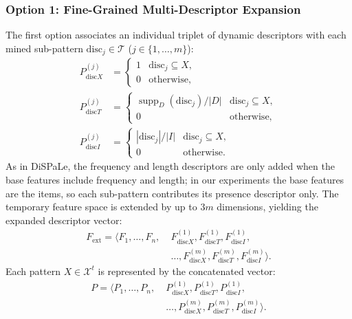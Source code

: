 \documentclass[sigconf]{acmart}
\newcommand{\supp}{\operatorname{supp}}
\newcommand{\disc}{\mathrm{disc}}
\begin{document}
\subsubsection{Option 1: Fine-Grained Multi-Descriptor Expansion}
The first option associates an individual triplet of dynamic descriptors with each mined sub-pattern $\disc_j\in\mathcal T$ ($j\in\{1,\ldots,m\}$):
\begin{align}
 P_{\disc X}^{(j)} & = \begin{cases}1 & \disc_j\subseteq X,\\0 & \text{otherwise},\end{cases} \label{eq:descriptor-x} \\
 P_{\disc T}^{(j)} & = \begin{cases}\supp_D(\disc_j)/|D| & \disc_j\subseteq X,\\0 & \text{otherwise},\end{cases} \label{eq:descriptor-t} \\
 P_{\disc I}^{(j)} & = \begin{cases}|\disc_j|/|I| & \disc_j\subseteq X,\\0 & \text{otherwise}.\end{cases} \label{eq:descriptor-i}
\end{align}
As in DiSPaLe, the frequency and length descriptors are only added when the base features include frequency and length; in our experiments the base features are the items, so each sub-pattern contributes its presence descriptor only. The temporary feature space is extended by up to $3m$ dimensions, yielding the expanded descriptor vector:
\begin{equation}\label{eq:features-fine}
\begin{split}
 F_{\mathrm{ext}}=\langle F_1,\ldots,F_n,\; &F_{\disc X}^{(1)}, F_{\disc T}^{(1)}, F_{\disc I}^{(1)},\\ &\ldots,F_{\disc X}^{(m)}, F_{\disc T}^{(m)}, F_{\disc I}^{(m)}\rangle.
\end{split}
\end{equation}
Each pattern $X\in\mathcal X^t$ is represented by the concatenated vector:
\begin{equation}\label{eq:patterns-fine}
\begin{split}
 P=\langle P_1,\ldots,P_n,\; &P_{\disc X}^{(1)},P_{\disc T}^{(1)},P_{\disc I}^{(1)},\\ &\ldots,P_{\disc X}^{(m)},P_{\disc T}^{(m)},P_{\disc I}^{(m)}\rangle.
\end{split}
\end{equation}
\end{document}
